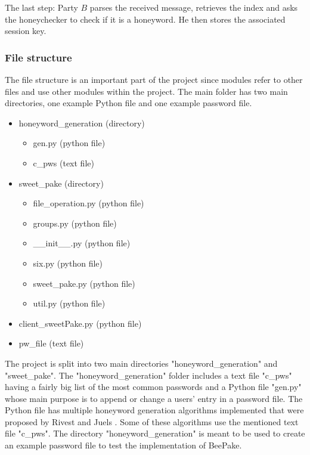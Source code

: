 \documentclass[../main.tex]{subfiles}
\begin{document}
The last step: Party \(B\) parses the received message, retrieves the index and
asks the honeychecker to check if it is a honeyword. He then stores the associated
session key.

\subsubsection{File structure} 
The file structure is an important part of the project since modules refer to other files and use
other modules within the project. The main folder has two main directories, one example Python
file and one example password file.

\begin{itemize}
	\item honeyword\_generation (directory)
	\begin{itemize}
		\item gen.py (python file)
		\item c\_pws (text file)
	\end{itemize}

	\item sweet\_pake (directory)
	\begin{itemize}
		\item file\_operation.py (python file)
		\item groups.py (python file)
		\item \_\_init\_\_.py (python file)
		\item six.py (python file)
		\item sweet\_pake.py (python file)
		\item util.py (python file)
	\end{itemize}
	\item client\_sweetPake.py (python file)
	\item pw\_file (text file)
\end{itemize}

The project is split into two main directories "honeyword\_generation" and
"sweet\_pake". The "honeyword\_generation" folder includes a text file "c\_pws"
having a fairly big list of the most common passwords and a Python file "gen.py"
whose main purpose is to append or change a users' entry in a password file.
The Python file has multiple honeyword generation algorithms implemented that
were proposed by Rivest and Juels \cite{juels2013honeywords}. Some of these
algorithms use the mentioned text file "c\_pws". The directory
"honeyword\_generation" is meant to be used to create an example password file
to test the implementation of BeePake.
\end{document}
